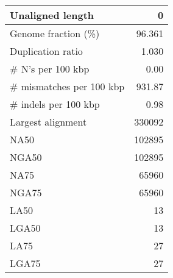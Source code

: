 \documentclass[12pt,a4paper]{article}
\begin{document}
\begin{table}[ht]
\begin{center}
\begin{tabular}{|l*{1}{|r}|}
Unaligned length & 0 \\ \hline
Genome fraction (\%) & 96.361 \\ \hline
Duplication ratio & 1.030 \\ \hline
\# N's per 100 kbp & 0.00 \\ \hline
\# mismatches per 100 kbp & 931.87 \\ \hline
\# indels per 100 kbp & 0.98 \\ \hline
Largest alignment & 330092 \\ \hline
NA50 & 102895 \\ \hline
NGA50 & 102895 \\ \hline
NA75 & 65960 \\ \hline
NGA75 & 65960 \\ \hline
LA50 & 13 \\ \hline
LGA50 & 13 \\ \hline
LA75 & 27 \\ \hline
LGA75 & 27 \\ \hline
\end{tabular}
\end{center}
\end{table}
\end{document}
